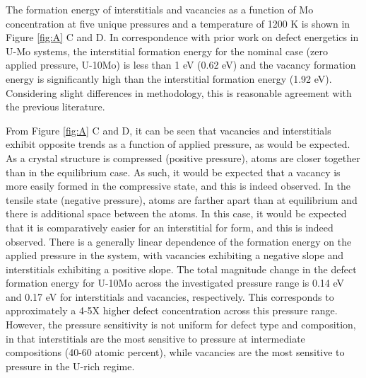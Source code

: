 \documentclass[default]{sn-jnl}%
\begin{document}
The formation energy of interstitials and vacancies as a function of Mo concentration at five unique pressures and a temperature of 1200 K is shown in Figure \ref{fig:A} C and D. In correspondence with prior work \cite{park2021} on defect energetics in U-Mo systems, the interstitial formation energy for the nominal case (zero applied pressure, U-10Mo) is less than 1 eV (0.62 eV) and the vacancy formation energy is significantly high than the interstitial formation energy (1.92 eV). Considering slight differences in methodology, this is reasonable agreement with the previous literature. 

From Figure \ref{fig:A} C and D, it can be seen that vacancies and interstitials exhibit opposite trends as a function of applied pressure, as would be expected. As a crystal structure is compressed (positive pressure), atoms are closer together than in the equilibrium case. As such, it would be expected that a vacancy is more easily formed in the compressive state, and this is indeed observed. In the tensile state (negative pressure), atoms are farther apart than at equilibrium and there is additional space between the atoms. In this case, it would be expected that it is comparatively easier for an interstitial for form, and this is indeed observed. There is a generally linear dependence of the formation energy on the applied pressure in the system, with vacancies exhibiting a negative slope and interstitials exhibiting a positive slope. The total magnitude change in the defect formation energy for U-10Mo across the investigated pressure range is 0.14 eV and 0.17 eV for interstitials and vacancies, respectively. This corresponds to approximately a 4-5X higher defect concentration across this pressure range. However, the pressure sensitivity is not uniform for defect type and composition, in that interstitials are the most sensitive to pressure at intermediate compositions (40-60 atomic percent), while vacancies are the most sensitive to pressure in the U-rich regime. 
\end{document}
